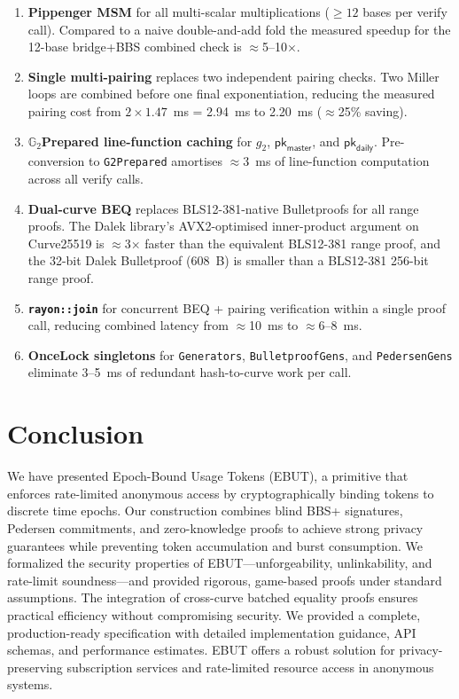 \documentclass[11pt]{article}
\theoremstyle{definitionstyle}
\theoremstyle{plain}
\begin{document}
\begin{enumerate}[leftmargin=*]
\item \textbf{Pippenger MSM} for all multi-scalar multiplications
  ($\geq 12$ bases per verify call).  Compared to a naive double-and-add
  fold the measured speedup for the 12-base bridge+BBS combined check is
  $\approx$5--10$\times$.

\item \textbf{Single multi-pairing} replaces two independent pairing
  checks.  Two Miller loops are combined before one final exponentiation,
  reducing the measured pairing cost from $2\times 1.47$~ms = 2.94~ms
  to 2.20~ms ($\approx$25\% saving).

\item \textbf{$\mathbb{G}_2$Prepared line-function caching} for $g_2$,
  $\mathsf{pk}_{\mathsf{master}}$, and $\mathsf{pk}_{\mathsf{daily}}$.
  Pre-conversion to \texttt{G2Prepared} amortises $\approx$3~ms of
  line-function computation across all verify calls.

\item \textbf{Dual-curve BEQ} replaces BLS12-381-native Bulletproofs for
  all range proofs.  The Dalek library's AVX2-optimised inner-product
  argument on Curve25519 is $\approx$3$\times$ faster than the equivalent
  BLS12-381 range proof, and the 32-bit Dalek Bulletproof (608~B) is
  smaller than a BLS12-381 256-bit range proof.

\item \textbf{\texttt{rayon::join}} for concurrent BEQ + pairing
  verification within a single proof call, reducing combined latency
  from $\approx$10~ms to $\approx$6--8~ms.

\item \textbf{OnceLock singletons} for \texttt{Generators},
  \texttt{BulletproofGens}, and \texttt{PedersenGens} eliminate
  3--5~ms of redundant hash-to-curve work per call.
\end{enumerate}

\section{Conclusion}

We have presented Epoch-Bound Usage Tokens (EBUT), a primitive that enforces rate-limited anonymous access by cryptographically binding tokens to discrete time epochs. Our construction combines blind BBS+ signatures, Pedersen commitments, and zero-knowledge proofs to achieve strong privacy guarantees while preventing token accumulation and burst consumption. We formalized the security properties of EBUT—unforgeability, unlinkability, and rate-limit soundness—and provided rigorous, game-based proofs under standard assumptions. The integration of cross-curve batched equality proofs ensures practical efficiency without compromising security. We provided a complete, production-ready specification with detailed implementation guidance, API schemas, and performance estimates. EBUT offers a robust solution for privacy-preserving subscription services and rate-limited resource access in anonymous systems.
\end{document}
